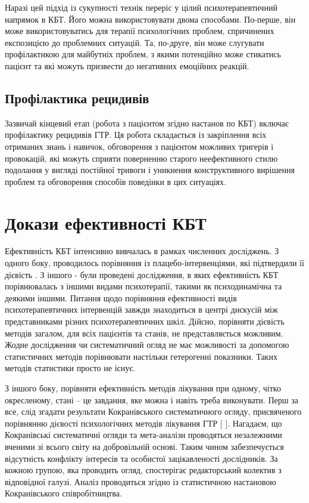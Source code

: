 Наразі цей підхід із сукупності технік переріс у цілий психотерапевтичний напрямок в КБТ. Його можна використовувати двома способами. По-перше, він може використовуватись для терапії психологічних проблем, спричинених експозицією до проблемних ситуацій. Та, по-друге, він може слугувати профілактикою для майбутніх проблем, з якими потенційно може стикатись пацієнт та які можуть призвести до негативних емоційних реакцій. 

\subsection {Профілактика рецидивів}
Зазвичай кінцевий етап (робота з пацієнтом згідно настанов по КБТ) включає профілактику рецидивів ГТР. Ця робота складається із закріплення всіх отриманих знань і навичок, обговорення з пацієнтом можливих тригерів і провокацій, які можуть сприяти поверненню старого неефективного стилю подолання у вигляді постійної тривоги і уникнення конструктивного вирішення проблем та обговорення способів поведінки в цих ситуаціях.

\section {Докази ефективності КБТ}
Ефективність КБТ інтенсивно вивчалась в рамках численних досліджень. З одного боку, проводилось порівняння із плацебо-інтервенціями, які підтвердили її дієвість . З іншого - були проведені дослідження, в яких ефективність КБТ порівнювалась з іншими видами психотерапії, такими як психодинамічна та деякими іншими. Питання щодо порівняння ефективності  видів психотерапевтичних інтервенцій завжди знаходиться в центрі дискусій між представниками різних психотерапевтичних шкіл. Дійсно, порівняти дієвість методів загалом, для всіх пацієнтів та станів, не представляється можливим. Жодне дослідження чи систематичний огляд не має можливості за допомогою статистичних методів порівнювати настільки гетерогенні показники. Таких методів статистики просто не існує.

З іншого боку, порівняти ефективність методів лікування при одному, чітко окресленому, стані – це завдання, яке можна і навіть треба виконувати. Перш за все, слід згадати результати Кокранівського систематичного огляду, присвяченого порівнянню дієвості психологічних методів лікування ГТР [
\cite{bib15}]. Нагадаєм, що Кокранівські систематичні огляди та мета-аналізи проводяться незалежними вченими зі всього світу на добровільній основі. Таким чином забезпечується відсутність конфлікту інтересів та особистої зацікавленості дослідників. За кожною групою, яка проводить огляд, спостерігає редакторський колектив з відповідної галузі. Аналіз проводиться згідно із статистичною настановою Кокранівського співробітництва.

